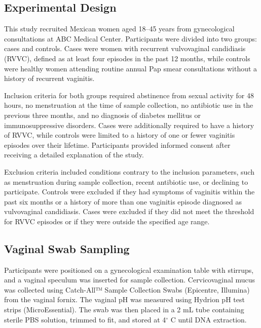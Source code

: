 \documentclass[biotech,article,submit,pdftex,moreauthors]{Definitions/mdpi}
\begin{document}
\subsection{Experimental Design}
This study recruited Mexican women aged 18--45 years from gynecological consultations at ABC Medical Center. Participants were divided into two groups: cases and controls. Cases were women with recurrent vulvovaginal candidiasis (RVVC), defined as at least four episodes in the past 12 months, while controls were healthy women attending routine annual Pap smear consultations without a history of recurrent vaginitis. 

Inclusion criteria for both groups required abstinence from sexual activity for 48 hours, no menstruation at the time of sample collection, no antibiotic use in the previous three months, and no diagnosis of diabetes mellitus or immunosuppressive disorders. Cases were additionally required to have a history of RVVC, while controls were limited to a history of one or fewer vaginitis episodes over their lifetime. Participants provided informed consent after receiving a detailed explanation of the study.

Exclusion criteria included conditions contrary to the inclusion parameters, such as menstruation during sample collection, recent antibiotic use, or declining to participate. Controls were excluded if they had symptoms of vaginitis within the past six months or a history of more than one vaginitis episode diagnosed as vulvovaginal candidiasis. Cases were excluded if they did not meet the threshold for RVVC episodes or if they were outside the specified age range.

\subsection{Vaginal Swab Sampling}
Participants were positioned on a gynecological examination table with stirrups, and a vaginal speculum was inserted for sample collection. Cervicovaginal mucus was collected using Catch-All™ Sample Collection Swabs (Epicentre, Illumina) from the vaginal fornix. The vaginal pH was measured using Hydrion pH test strips (MicroEssential). The swab was then placed in a 2 mL tube containing sterile PBS solution, trimmed to fit, and stored at 4$^\circ$ C until DNA extraction.
\end{document}
